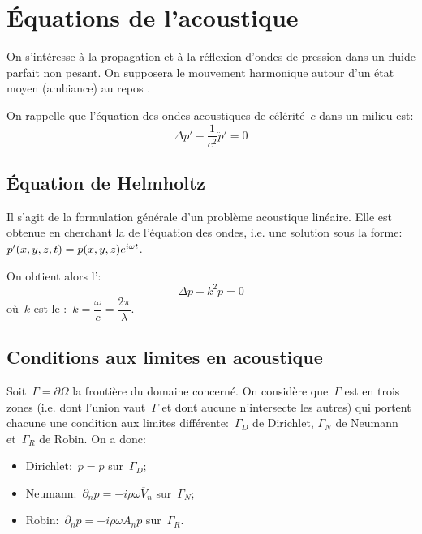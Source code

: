 \medskip
\section{Équations de l'acoustique}
On s'intéresse à la propagation et à la réflexion d'ondes de pression dans un
fluide parfait non pesant.
On supposera le mouvement harmonique autour d'un état moyen (ambiance) au repos
.

\medskip
On rappelle que l'équation des ondes acoustiques de célérité~$c$ dans un milieu est:
\begin{equation}
\Delta p' - \dfrac1{c^2} \ddot{p}' = 0
\end{equation}

\medskip
\subsection{Équation de Helmholtz}
Il s'agit de la formulation générale d'un problème acoustique linéaire.
Elle est obtenue en cherchant la  de l'équation
des ondes, i.e. une solution sous la forme:~$p'(x,y,z,t)=p(x,y,z)\mathrm \mathrm{e}^{i\omega t}$.

On obtient alors l':
\begin{equation} \Delta p + k^2 p=0 \end{equation}
où~$k$ est le :~$k=\dfrac\omega{c}=\dfrac{2\pi}\lambda$.

\medskip
\subsection{Conditions aux limites en acoustique}
Soit~$\Gamma=\partial\Omega$ la frontière du domaine concerné.
On considère que~$\Gamma$ est  en trois zones (i.e. dont
l'union vaut~$\Gamma$ et dont aucune n'intersecte les autres) qui
portent chacune une condition aux limites différente:~$\Gamma_D$ de Dirichlet,
$\Gamma_N$ de Neumann et~$\Gamma_R$ de Robin.
\medskip
On a donc:
\begin{itemize}
  \item Dirichlet:~$p=\overline{p}$ sur~$\Gamma_D$;\\[-2ex]
  \item Neumann:~$\partial_n p = -i\rho\omega \overline{V}_n$ sur~$\Gamma_N$;\\[-2ex]
  \item Robin:~$\partial_n p=-i\rho\omega A_n p$ sur~$\Gamma_R$.
\end{itemize}
\medskip{}
